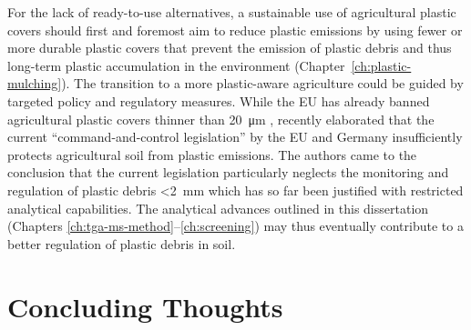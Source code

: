 For the lack of ready-to-use alternatives, a sustainable use of agricultural plastic covers should first and foremost aim to reduce plastic emissions by using fewer or more durable plastic covers that prevent the emission of plastic debris and thus long-term plastic accumulation in the environment (Chapter~\ref{ch:plastic-mulching}).
The transition to a more plastic-aware agriculture could be guided by targeted policy and regulatory measures. While the EU has already banned agricultural plastic covers thinner than \SI{20}{\micro\meter} \citep[Chapter~\ref{ch:screening};][]{EN13655Plastics2018}, \citet{StubenrauchPlastic2020} recently elaborated that the current ``command-and-control legislation'' by the EU and Germany insufficiently protects agricultural soil from plastic emissions. The authors came to the conclusion that the current legislation particularly neglects the monitoring and regulation of plastic debris \SI{<2}{\milli\meter} which has so far been justified with restricted analytical capabilities. The analytical advances outlined in this dissertation (Chapters \ref{ch:tga-ms-method}--\ref{ch:screening}) may thus eventually contribute to a better regulation of plastic debris in soil.

\section{Concluding Thoughts}
\label{sec:general-discussion:conclusion}


